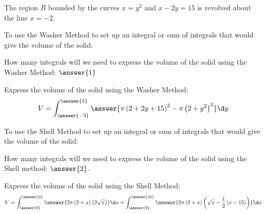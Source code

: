 \documentclass{ximera}
\author{ Jason Miller}
\begin{document}
\begin{exercise}

The region $R$ bounded by the curves $x=y^{2}$ and $x-2y=15$ is revolved about the line $x=-2$. 

To use the Washer Method to set up an integral or sum of integrals that would give the volume of the solid: 

  \begin{multipleChoice}
  \end{multipleChoice}

How many integrals will we need to express the volume of the solid using the Washer Method: $\answer{1}$


\begin{exercise} 
Express the volume of the solid using the Washer Method: 
\[
V=\int_{\answer{-3}}^{\answer{5}} \answer{\pi \left(2+2y+15 \right)^{2}-\pi \left( 2+y^{2}\right)^{2}} \d y 
\] 


\end{exercise}
\end{exercise}

To use the Shell Method to set up an integral or sum of integrals that would give the volume of the solid: 

  \begin{multipleChoice}
  \end{multipleChoice}

How many integrals will we need to express the volume of the solid using the Shell method: $\answer{2}$. 


\begin{exercise}
Express the volume of the solid using the Shell Method: 
\[
V=\int_{\answer{0}}^{\answer{9}} \answer{2\pi \left( 2+x \right) \left(2 \sqrt{x} \right)} \d x + \int_{\answer{9}}^{\answer{25}} \answer{ 2\pi \left( 2 +x \right) \left( \sqrt{x} - \frac{1}{2}\left( x -15 \right) \right) } \d x 
\]
\end{exercise}
\end{document}
